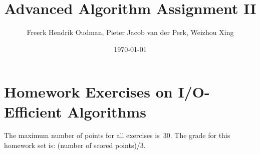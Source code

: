 \documentclass{article}
\title{Advanced Algorithm Assignment II}
\author{Freerk Hendrik Oudman, Pieter Jacob van der Perk, Weizhou Xing}
\date{\today}
\begin{document}
    
    \maketitle
    
    \section*{Homework Exercises on I/O-Efficient Algorithms}
    The maximum number of points for all exercises is~30.
    The grade for this homework set is: (number of scored points)/3.
    
    \newcommand{\setnr}{IO.I}
\end{document}

